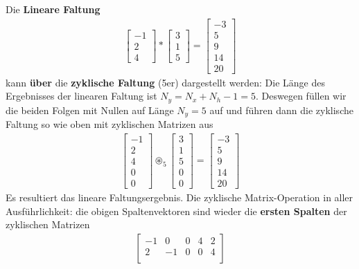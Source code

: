 \begin{ExCalc}
Die \textbf{Lineare Faltung}
\begin{align}
\begin{bmatrix}
-1 \\
 2 \\
 4
\end{bmatrix}
\ast
\begin{bmatrix}
3\\
1\\
5
\end{bmatrix}
=
\begin{bmatrix}
-3\\5\\9\\14\\20
\end{bmatrix}
\end{align}
kann \textbf{über} die \textbf{zyklische Faltung} (5er) dargestellt werden:
Die Länge des Ergebnisses der linearen Faltung ist  $N_y = N_x+N_h-1=5$.
Deswegen füllen wir die beiden Folgen mit Nullen auf Länge $N_y=5$ auf und führen
dann die zyklische Faltung so wie oben mit zyklischen Matrizen aus
\begin{align}
\begin{bmatrix}
-1 \\
 2 \\
 4 \\
 0 \\
 0
\end{bmatrix}
\circledast_5
\begin{bmatrix}
3\\
1\\
5\\
0\\
0
\end{bmatrix}
=
\begin{bmatrix}
-3\\5\\9\\14\\20
\end{bmatrix}
\end{align}
%
Es resultiert das lineare Faltungsergebnis.
%
Die zyklische Matrix-Operation in aller Ausführlichkeit:
die obigen Spaltenvektoren sind wieder die \textbf{ersten Spalten} der zyklischen
Matrizen
\begin{align}
\label{eq:C8864C8D9F_LinConv_with_CycConv}
\begin{bmatrix}
-1  &   0  &   0  &   4  &   2\\
 2  &  -1  &   0  &   0  &   4\\

\end{bmatrix}
\end{align}
\end{ExCalc}
